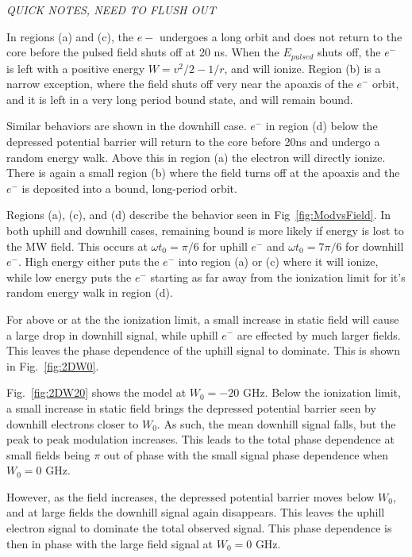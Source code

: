 \documentclass[aps,pra,preprint,groupedaddress]{revtex4-1}
\begin{document}
\emph{QUICK NOTES, NEED TO FLUSH OUT}

In regions (a) and (c), the $e-$ undergoes a long orbit and does not return to the core before the pulsed field shuts off at 20 ns. When the $E_{pulsed}$ shuts off, the $e^-$ is left with a positive energy $W = v^2/2 - 1/r$, and will ionize. Region (b) is a narrow exception, where the field shuts off very near the apoaxis of the $e^-$ orbit, and it is left in a very long period bound state, and will remain bound.

Similar behaviors are shown in the downhill case. $e^-$ in region (d) below the depressed potential barrier will return to the core before 20ns and undergo a random energy walk. Above this in region (a) the electron will directly ionize. There is again a small region (b) where the field turns off at the apoaxis and the $e^-$ is deposited into a bound, long-period orbit.

Regions (a), (c), and (d) describe the behavior seen in Fig~\ref{fig:ModvsField}. In both uphill and downhill cases, remaining bound is more likely if energy is lost to the MW field. This occurs at $\omega t_0 = \pi/6$ for uphill $e^-$ and $\omega t_0 = 7\pi/6$ for downhill $e^-$. High energy either puts the $e^-$ into region (a) or (c) where it will ionize, while low energy puts the $e^-$ starting as far away from the ionization limit for it's random energy walk in region (d).

For above or at the the ionization limit, a small increase in static field will cause a large drop in downhill signal, while uphill $e^-$ are effected by much larger fields. This leaves the phase dependence of the uphill signal to dominate. This is shown in Fig.~\ref{fig:2DW0}.

Fig.~\ref{fig:2DW20} shows the model at $W_0 = -20$ GHz. Below the ionization limit, a small increase in static field brings the depressed potential barrier seen by downhill electrons closer to $W_0$. As such, the mean downhill signal falls, but the peak to peak modulation increases. This leads to the total phase dependence at small fields being $\pi$ out of phase with the small signal phase dependence when $W_0 = 0$ GHz.

However, as the field increases, the depressed potential barrier moves below $W_0$, and at large fields the downhill signal again disappears. This leaves the uphill electron signal to dominate the total observed signal. This phase dependence is then in phase with the large field signal at $W_0 = 0$ GHz.
\end{document}
